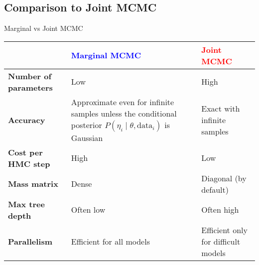 \subsection{Comparison to Joint MCMC}
\begin{frame}{Marginal vs Joint MCMC}
	\centering
	\small
	\begin{tabular}{|l|p{}|p{}|}
		\toprule
		                              & \textcolor{blue}{\textbf{Marginal MCMC}}                                                                                  & \textcolor{red}{\textbf{Joint MCMC}} \\ \midrule
		\textbf{Number of parameters} & Low                                                                                                                       & High                                 \\ \midrule
		\textbf{Accuracy}             & Approximate even for infinite samples unless the conditional posterior $P(\eta_i \mid \theta, \text{data}_i)$ is Gaussian & Exact with infinite samples          \\ \midrule
		\textbf{Cost per HMC step}    & High                                                                                                                      & Low                                  \\ \midrule
		\textbf{Mass matrix}          & Dense                                                                                                                     & Diagonal (by default)                \\ \midrule
		\textbf{Max tree depth}       & Often low                                                                                                                 & Often high                           \\ \midrule
		\textbf{Parallelism}          & Efficient for all models                                                                                                  & Efficient only for difficult models  \\
		\bottomrule
	\end{tabular}
\end{frame}

